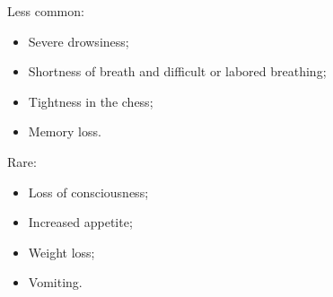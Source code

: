 \documentclass[10.5pt]{article}
\begin{document}
    \noindent Less common:
    \begin{itemize}
      \item Severe drowsiness;
      \item Shortness of breath and difficult or labored breathing;
      \item Tightness in the chess;
      \item Memory loss.
    \end{itemize}
    
    \noindent Rare:
    \begin{itemize}
      \item Loss of consciousness;
      \item Increased appetite;
      \item Weight loss;
      \item Vomiting.
    \end{itemize}
  
\end{document}
